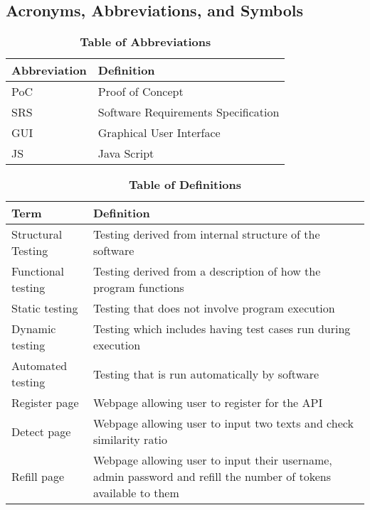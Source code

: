 \documentclass[12pt, titlepage]{article}
\begin{document}
\subsection{Acronyms, Abbreviations, and Symbols}
	
\begin{table}[H]
\caption{\textbf{Table of Abbreviations}} \label{Table}

\begin{tabularx}{\textwidth}{p{3cm}X}
\toprule
\textbf{Abbreviation} & \textbf{Definition} \\
\midrule
PoC & Proof of Concept\\
SRS & Software Requirements Specification\\ 
GUI & Graphical User Interface \\
JS & Java Script \\
\bottomrule
\end{tabularx}

\end{table}

\begin{table}[H]
\caption{\textbf{Table of Definitions}} \label{Table}

\begin{tabularx}{\textwidth}{p{4cm}X}
\toprule
\textbf{Term} & \textbf{Definition}\\
\midrule
Structural Testing & Testing derived from internal structure of the software\\
Functional testing & Testing derived from a description of how the program functions\\
Static testing & Testing that does not involve program execution \\
Dynamic testing & Testing which includes having test cases run during execution \\
Automated testing & Testing that is run automatically by software \\
Register page & Webpage allowing user to register for the API \\
Detect page & Webpage allowing user to input two texts and check similarity ratio \\
Refill page & Webpage allowing user to input their username, admin password and refill the number of tokens available to them \\

\bottomrule
\end{tabularx}

\end{table}	
\end{document}
